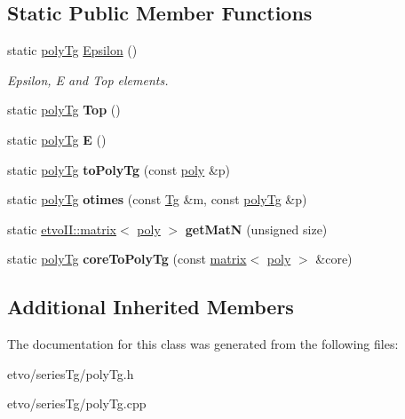 \subsection*{Static Public Member Functions}
\begin{DoxyCompactItemize}
\item 
\mbox{\label{classetvo_i_i_1_1poly_tg_a2285557904eb669575096b9faae416eb}} 
static \mbox{\hyperlink{classetvo_i_i_1_1poly_tg}{poly\+Tg}} \mbox{\hyperlink{classetvo_i_i_1_1poly_tg_a2285557904eb669575096b9faae416eb}{Epsilon}} ()
\begin{DoxyCompactList}\small\item\em Epsilon, E and Top elements. \end{DoxyCompactList}\item 
\mbox{\label{classetvo_i_i_1_1poly_tg_a8b3ec0536f45a8ad3e2375ee0c39e7c4}} 
static \mbox{\hyperlink{classetvo_i_i_1_1poly_tg}{poly\+Tg}} {\bfseries Top} ()
\item 
\mbox{\label{classetvo_i_i_1_1poly_tg_add8eda75a141e5f1434c389493c45dcd}} 
static \mbox{\hyperlink{classetvo_i_i_1_1poly_tg}{poly\+Tg}} {\bfseries E} ()
\item 
\mbox{\label{classetvo_i_i_1_1poly_tg_ac3b58c29621a09c45c18bab5e89aabb3}} 
static \mbox{\hyperlink{classetvo_i_i_1_1poly_tg}{poly\+Tg}} {\bfseries to\+Poly\+Tg} (const \mbox{\hyperlink{classetvo_i_i_1_1poly}{poly}} \&p)
\item 
\mbox{\label{classetvo_i_i_1_1poly_tg_aec5b4b5f47a5b6be81c77ee25822ade8}} 
static \mbox{\hyperlink{classetvo_i_i_1_1poly_tg}{poly\+Tg}} {\bfseries otimes} (const \mbox{\hyperlink{classetvo_i_i_1_1_tg}{Tg}} \&m, const \mbox{\hyperlink{classetvo_i_i_1_1poly_tg}{poly\+Tg}} \&p)
\item 
\mbox{\label{classetvo_i_i_1_1poly_tg_a82404bc41285950fc405668fbb925a21}} 
static \mbox{\hyperlink{classetvo_i_i_1_1matrix}{etvo\+I\+I\+::matrix}}$<$ \mbox{\hyperlink{classetvo_i_i_1_1poly}{poly}} $>$ {\bfseries get\+MatN} (unsigned size)
\item 
\mbox{\label{classetvo_i_i_1_1poly_tg_a6c9e90cee9ced76c2b6b6e840751280a}} 
static \mbox{\hyperlink{classetvo_i_i_1_1poly_tg}{poly\+Tg}} {\bfseries core\+To\+Poly\+Tg} (const \mbox{\hyperlink{classetvo_i_i_1_1matrix}{matrix}}$<$ \mbox{\hyperlink{classetvo_i_i_1_1poly}{poly}} $>$ \&core)
\end{DoxyCompactItemize}
\subsection*{Additional Inherited Members}


The documentation for this class was generated from the following files\+:\begin{DoxyCompactItemize}
\item 
etvo/series\+Tg/poly\+Tg.\+h\item 
etvo/series\+Tg/poly\+Tg.\+cpp\end{DoxyCompactItemize}

